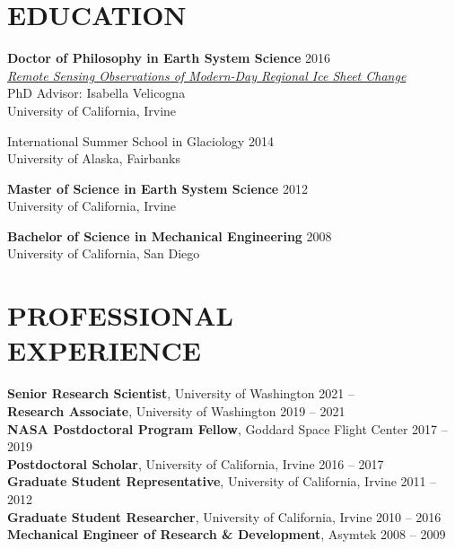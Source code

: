 \documentclass[margin,line,11pt]{res}
\begin{document}


\address{email: \href{mailto:tsutterl@uw.edu}{tsutterl@uw.edu}}
\address{website: \href{https://tsutterley.github.io}{tsutterley.github.io}}

\begin{resume}

\section{EDUCATION}
	{\bf Doctor of Philosophy in Earth System Science} \hfill 2016  \\
		{\em\href{http://search.proquest.com/docview/1794656381}{Remote Sensing Observations of Modern-Day Regional Ice Sheet Change}} \\
		PhD Advisor: Isabella Velicogna \\
		University of California, Irvine

	International Summer School in Glaciology \hfill 2014\\
	University of Alaska, Fairbanks

	{\bf Master of Science in Earth System Science} \hfill 2012  \\
		University of California, Irvine

	{\bf Bachelor of Science in Mechanical Engineering} \hfill 2008  \\
		University of California, San Diego

\section{PROFESSIONAL \\ EXPERIENCE}
	{\bf Senior Research Scientist}, University of Washington \hfill 2021 -- \\ %
	{\bf Research Associate}, University of Washington \hfill 2019 -- 2021 \\ %
	{\bf NASA Postdoctoral Program Fellow}, Goddard Space Flight Center \hfill 2017 -- 2019\\
	{\bf Postdoctoral Scholar}, University of California, Irvine \hfill 2016 -- 2017 \\
	{\bf Graduate Student Representative}, University of California, Irvine \hfill 2011 -- 2012 \\
	{\bf Graduate Student Researcher}, University of California, Irvine \hfill 2010 -- 2016 \\
	{\bf Mechanical Engineer of Research \& Development}, Asymtek \hfill 2008 -- 2009


\end{resume}
\end{document}
